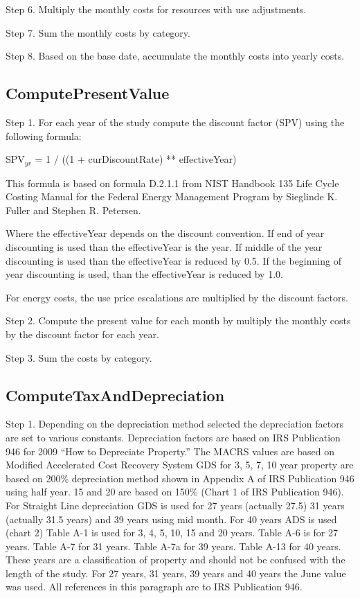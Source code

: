 Step 6. Multiply the monthly costs for resources with use adjustments.

Step 7. Sum the monthly costs by category.

Step 8. Based on the base date, accumulate the monthly costs into yearly costs.

\subsection{ComputePresentValue}\label{computepresentvalue}

Step 1. For each year of the study compute the discount factor (SPV) using the following formula:

SPV\(_{yr}\) = 1 / ((1 + curDiscountRate) ** effectiveYear)

This formula is based on formula D.2.1.1 from NIST Handbook 135 Life Cycle Costing Manual for the Federal Energy Management Program by Sieglinde K. Fuller and Stephen R. Petersen.

Where the effectiveYear depends on the discount convention. If end of year discounting is used than the effectiveYear is the year. If middle of the year discounting is used than the effectiveYear is reduced by 0.5. If the beginning of year discounting is used, than the effectiveYear is reduced by 1.0.

For energy costs, the use price escalations are multiplied by the discount factors.

Step 2. Compute the present value for each month by multiply the monthly costs by the discount factor for each year.

Step 3. Sum the costs by category.

\subsection{ComputeTaxAndDepreciation}\label{computetaxanddepreciation}

Step 1. Depending on the depreciation method selected the depreciation factors are set to various constants. Depreciation factors are based on IRS Publication 946 for 2009 ``How to Depreciate Property.'' The MACRS values are based on Modified Accelerated Cost Recovery System GDS for 3, 5, 7, 10 year property are based on 200\% depreciation method shown in Appendix A of IRS Publication 946 using half year. 15 and 20 are based on 150\% (Chart 1 of IRS Publication 946). For Straight Line depreciation GDS is used for 27 years (actually 27.5) 31 years (actually 31.5 years) and 39 years using mid month. For 40 years ADS is used (chart 2) Table A-1 is used for 3, 4, 5, 10, 15 and 20 years. Table A-6 is for 27 years. Table A-7 for 31 years. Table A-7a for 39 years. Table A-13 for 40 years. These years are a classification of property and should not be confused with the length of the study. For 27 years, 31 years, 39 years and 40 years the June value was used. All references in this paragraph are to IRS Publication 946.


